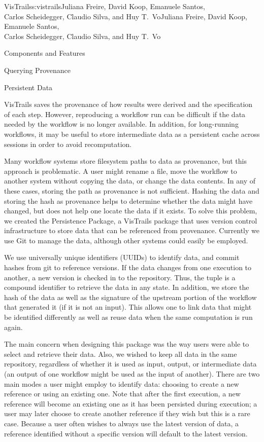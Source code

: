 \begin{aosachaptertoc}{VisTrails}{s:vistrails}{Juliana Freire, David Koop, Emanuele Santos, \\ Carlos Scheidegger, Claudio Silva, and Huy T.\ Vo}{Juliana Freire, David Koop, Emanuele Santos, \\ \hspace*{0.9cm} Carlos Scheidegger, Claudio Silva, and Huy T.\ Vo}
\begin{aosasect1}{Components and Features}
\begin{aosasect2}{Querying Provenance}
\end{aosasect2}

\begin{aosasect2}{Persistent Data}

VisTrails saves the provenance of how results were derived and the
specification of each step. However, reproducing a workflow run can be
difficult if the data needed by the workflow is no longer available.
In addition, for long-running workflows, it may be useful to store
intermediate data as a persistent cache across sessions in order to
avoid recomputation.

Many workflow systems store filesystem paths to data as provenance,
but this approach is problematic.  A user might rename a file, move
the workflow to another system without copying the data, or change the
data contents.  In any of these cases, storing the path as provenance
is not sufficient.  Hashing the data and storing
the hash as provenance helps to determine whether the data might have
changed, but does not help one locate the data if it exists.  To solve
this problem, we created the Persistence Package, a VisTrails package
that uses version control infrastructure to store data that can be
referenced from provenance.  Currently we use Git to manage the data,
although other systems could easily be employed.

We use universally unique identifiers (UUIDs) to identify data, and
commit hashes from git to reference versions.  If the data changes
from one execution to another, a new version is checked in to the
repository.  Thus, the  tuple is a compound identifier
to retrieve the data in any state.  In addition, we store the hash of
the data as well as the signature of the upstream portion of the
workflow that generated it (if it is not an input).  This allows one
to link data that might be identified differently as well as reuse
data when the same computation is run again.

The main concern when designing this package was the way users were
able to select and retrieve their data.  Also, we wished to keep all
data in the same repository, regardless of whether it is used as
input, output, or intermediate data (an output of one workflow might
be used as the input of another).  There are two main modes a user
might employ to identify data: choosing to create a new reference or
using an existing one.  Note that after the first execution, a new
reference will become an existing one as it has been persisted during
execution; a user may later choose to create another reference if
they wish but this is a rare case.  Because a user often wishes to
always use the latest version of data, a reference identified without
a specific version will default to the latest version.


\end{aosasect2}
\end{aosasect1}
\end{aosachaptertoc}
